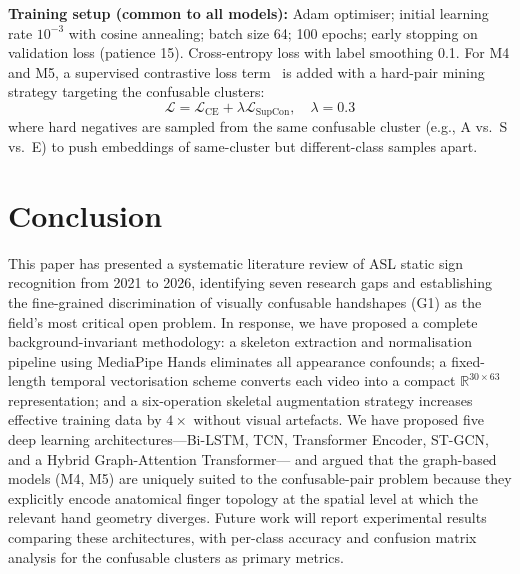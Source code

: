 \documentclass[conference]{IEEEtran}
\begin{document}
\textbf{Training setup (common to all models):} Adam optimiser; initial learning
rate $10^{-3}$ with cosine annealing; batch size 64; 100 epochs; early stopping
on validation loss (patience 15). Cross-entropy loss with label smoothing 0.1.
For M4 and M5, a supervised contrastive loss term~\cite{khosla2020} is added
with a hard-pair mining strategy targeting the confusable clusters:
\begin{equation}
  \mathcal{L} = \mathcal{L}_\text{CE} + \lambda \mathcal{L}_\text{SupCon},
  \quad \lambda = 0.3
\end{equation}
where hard negatives are sampled from the same confusable cluster
(e.g., A vs.\ S vs.\ E) to push embeddings of same-cluster but different-class
samples apart.

\section{Conclusion}
\label{sec:conclusion}

This paper has presented a systematic literature review of ASL static sign
recognition from 2021 to 2026, identifying seven research gaps and establishing
the fine-grained discrimination of visually confusable handshapes (G1) as the
field's most critical open problem. In response, we have proposed a complete
background-invariant methodology: a skeleton extraction and normalisation
pipeline using MediaPipe Hands eliminates all appearance confounds; a fixed-
length temporal vectorisation scheme converts each video into a compact
$\mathbb{R}^{30 \times 63}$ representation; and a six-operation skeletal
augmentation strategy increases effective training data by $4\times$ without
visual artefacts. We have proposed five deep learning architectures---Bi-LSTM,
TCN, Transformer Encoder, ST-GCN, and a Hybrid Graph-Attention Transformer---
and argued that the graph-based models (M4, M5) are uniquely suited to the
confusable-pair problem because they explicitly encode anatomical finger topology
at the spatial level at which the relevant hand geometry diverges. Future work
will report experimental results comparing these architectures, with per-class
accuracy and confusion matrix analysis for the confusable clusters as primary
metrics.
\end{document}
